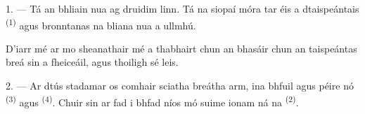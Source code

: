 %
%
%

\VUsaut{4.0mm}
\VUsaut{2.0mm}
\VUsaut{3.4mm}

1. --- Tá an bhliain nua ag druidim linn. Tá na siopaí móra tar éis a dtaispeántais
 \textsuperscript{(1)} agus bronntanas na bliana nua a ullmhú.

D'iarr mé ar mo sheanathair mé a thabhairt chun an bhasáir chun an taispeántas breá
sin a fheiceáil, agus thoiligh sé leis.

2. --- Ar dtús stadamar os comhair sciatha breátha arm, ina bhfuil 
 agus péire  nó
  \textsuperscript{(3)} agus 
\textsuperscript{(4)}. Chuir sin ar fad i bhfad níos mó suime ionam ná na
 \textsuperscript{(2)}.

\VUsaut{3.0mm}
\VUsaut{2.6mm}

